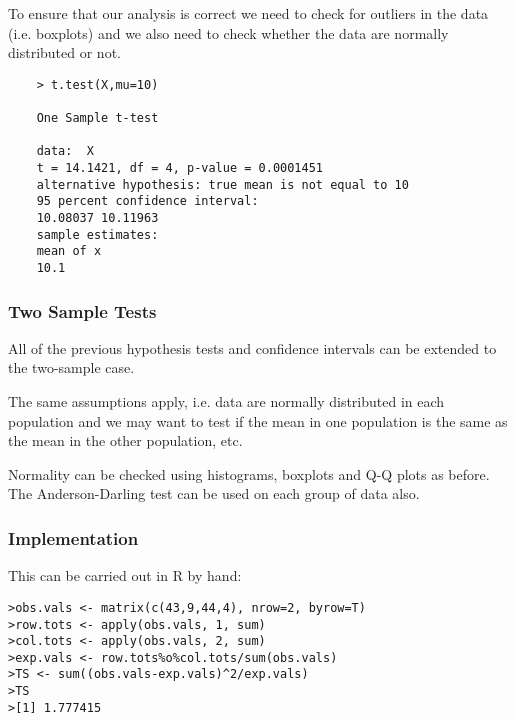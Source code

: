 \documentclass[a4paper,12pt]{article}
\begin{document}
To ensure that our analysis is correct we need to check for
outliers in the data (i.e. boxplots) and we also need to check
whether the data are normally distributed or not.

\begin{framed}
	\begin{verbatim}
	> t.test(X,mu=10)
	
	One Sample t-test
	
	data:  X 
	t = 14.1421, df = 4, p-value = 0.0001451
	alternative hypothesis: true mean is not equal to 10 
	95 percent confidence interval:
	10.08037 10.11963 
	sample estimates:
	mean of x 
	10.1 
	\end{verbatim}
\end{framed}




\newpage



\subsubsection{Two Sample Tests}


All of the previous hypothesis tests and confidence intervals can be
extended to the two-sample case.

The same assumptions apply, i.e. data are normally distributed in
each population and we may want to test if the mean in one
population is the same as the mean in the other population, etc.

Normality can be checked using histograms, boxplots and Q-Q
plots as before. The Anderson-Darling test can be used on
each group of data also.


\subsubsection{Implementation}

This can be carried out in R by hand:

\footnotesize \begin{verbatim}
>obs.vals <- matrix(c(43,9,44,4), nrow=2, byrow=T)
>row.tots <- apply(obs.vals, 1, sum)
>col.tots <- apply(obs.vals, 2, sum)
>exp.vals <- row.tots%o%col.tots/sum(obs.vals)
>TS <- sum((obs.vals-exp.vals)^2/exp.vals)
>TS
>[1] 1.777415
\end{verbatim}\normalsize
\end{document}
